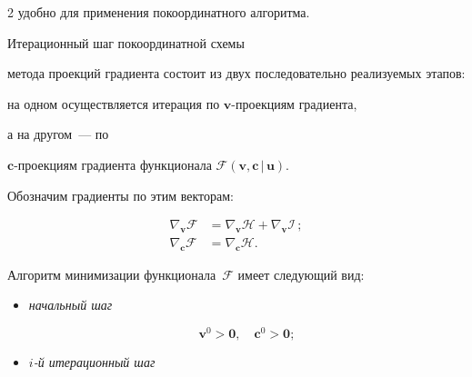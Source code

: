 \begin{multicols}{2}
удобно для применения покоординатного ал\-го\-ритма.





Итерационный шаг покоординатной схемы


метода проекций градиента состоит из двух последовательно реализуемых этапов: 


на одном осуществляется итерация по  $\mathbf{v}$-про\-ек\-ци\-ям градиента, 


а на другом~--- по 


$\mathbf{c}$-про\-ек\-ци\-ям градиента функционала $\mathcal{F}(\mathbf{v}, 


\mathbf{c}\,|\,\mathbf{u})$.


Обозначим градиенты по этим векторам:


\begin{align*}






\nabla_{\mathbf{v}} \mathcal{F} &= \nabla_{\mathbf{v}} \mathcal{H} + 


\nabla_{\mathbf{v}} \mathcal{I}\,;\\[6pt]


\nabla_{\mathbf{c}} \mathcal{F} &= \nabla_{\mathbf{c}} \mathcal{H}.








\end{align*}





Алгоритм минимизации функционала~$\mathcal{F}$ имеет следующий вид:


\begin{itemize}


\item[(\textit{a})] \textit{начальный шаг}





\noindent


$$


\mathbf{v}^0 > \mathbf{0},\quad \mathbf{c}^0 > \mathbf{0};


$$


\item[(\textit{б})] \textit{$i$-й итерационный шаг}


$$



\end{itemize}
\end{multicols}

